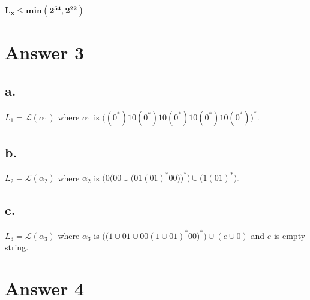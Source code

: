 \documentclass[12pt]{article}
\begin{document}
\begin{center}
  $\boldsymbol{L_x \leq min(2^{54}, 2^{22})}$
\end{center}

\section*{Answer 3}


\subsection*{a.}
\begin{center}
  $L_1 = \mathcal{L}(\alpha_1)$ where $\alpha_1$ is $\big((0^*)10(0^*)10(0^*)10(0^*)10(0^*)\big)^*$.
\end{center}

\subsection*{b.}
\begin{center}
  $L_2 = \mathcal{L}(\alpha_2)$ where $\alpha_2$ is $\bigg(0\Big(00 \cup \big(01(01)^*00\big)\Big)^*\bigg) \cup \big(1(01)^*\big)$.
\end{center}
\subsection*{c.}
\begin{center}
  $L_3 = \mathcal{L}(\alpha_3)$ where $\alpha_3$ is $\Big(\big(1 \cup 01 \cup 00(1 \cup 01)^*00\big)^*\Big) \cup (e \cup 0)$ and $e$ is empty string.
\end{center}



\section*{Answer 4}
\end{document}
